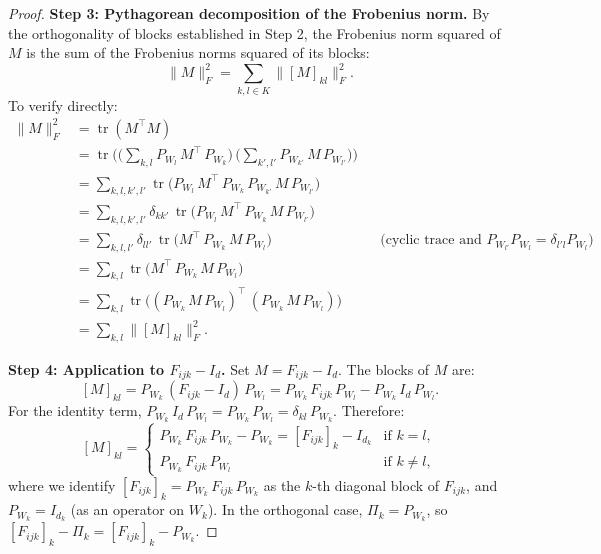 \begin{proof}
\medskip\noindent\textbf{Step 3: Pythagorean decomposition of the Frobenius norm.}
By the orthogonality of blocks established in Step 2, the Frobenius norm squared of $M$ is
the sum of the Frobenius norms squared of its blocks:
\begin{equation}
\label{eq:pythagorean}
    \|M\|_F^2 = \sum_{k, l \in K} \|[M]_{kl}\|_F^2.
\end{equation}
To verify directly:
\begin{align*}
    \|M\|_F^2
    &= \operatorname{tr}(M^\top M) \\
    &= \operatorname{tr}\!\bigg(\Big(\sum_{k,l} P_{W_l}\, M^\top\, P_{W_k}\Big)\,
       \Big(\sum_{k',l'} P_{W_{k'}}\, M\, P_{W_{l'}}\Big)\bigg) \\
    &= \sum_{k,l,k',l'} \operatorname{tr}\!\big(P_{W_l}\, M^\top\, P_{W_k}\,
       P_{W_{k'}}\, M\, P_{W_{l'}}\big) \\
    &= \sum_{k,l,k',l'} \delta_{kk'}\, \operatorname{tr}\!\big(P_{W_l}\, M^\top\,
       P_{W_k}\, M\, P_{W_{l'}}\big) \\
    &= \sum_{k,l,l'} \delta_{ll'}\, \operatorname{tr}\!\big(M^\top\, P_{W_k}\, M\,
       P_{W_l}\big)
       && \text{(cyclic trace and } P_{W_{l'}} P_{W_l} = \delta_{l'l} P_{W_l}\text{)} \\
    &= \sum_{k,l} \operatorname{tr}\!\big(M^\top\, P_{W_k}\, M\, P_{W_l}\big) \\
    &= \sum_{k,l} \operatorname{tr}\!\big((P_{W_k}\, M\, P_{W_l})^\top\,
       (P_{W_k}\, M\, P_{W_l})\big) \\
    &= \sum_{k,l} \|[M]_{kl}\|_F^2.
\end{align*}

\medskip\noindent\textbf{Step 4: Application to $F_{ijk} - I_d$.}
Set $M = F_{ijk} - I_d$. The blocks of $M$ are:
\[
    [M]_{kl} = P_{W_k}\, (F_{ijk} - I_d)\, P_{W_l}
    = P_{W_k}\, F_{ijk}\, P_{W_l} - P_{W_k}\, I_d\, P_{W_l}.
\]
For the identity term, $P_{W_k}\, I_d\, P_{W_l} = P_{W_k}\, P_{W_l} = \delta_{kl}\,
P_{W_k}$. Therefore:
\[
    [M]_{kl} =
    \begin{cases}
        P_{W_k}\, F_{ijk}\, P_{W_k} - P_{W_k} = [F_{ijk}]_k - I_{d_k}
        & \text{if } k = l, \\[4pt]
        P_{W_k}\, F_{ijk}\, P_{W_l}
        & \text{if } k \neq l,
    \end{cases}
\]
where we identify $[F_{ijk}]_k = P_{W_k}\, F_{ijk}\, P_{W_k}$ as the $k$-th diagonal
block of $F_{ijk}$, and $P_{W_k} = I_{d_k}$ (as an operator on $W_k$). In the orthogonal
case, $\Pi_k = P_{W_k}$, so $[F_{ijk}]_k - \Pi_k = [F_{ijk}]_k - P_{W_k}$.


\end{proof}
